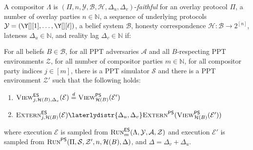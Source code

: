 \begin{definition}
  A compositor $\Lambda$
  is $(\Pi,\allowbreak n,\allowbreak \mathcal{Y},\allowbreak \mathcal{B},\allowbreak \mathcal{H},\allowbreak \Delta_u,\allowbreak \Delta_v)$-\emph{faithful}
  for an overlay protocol $\Pi$,
  a number of overlay parties $n \in \mathbb{N}$,
  a sequence of underlying protocols $\mathcal{Y} = (\Y[][1], \ldots, \Y[][\ell])$,
  a belief system $\mathcal{B}$,
  honesty correspondence $\mathcal{H}: \mathcal{B} \longrightarrow 2^{[n]}$,
  lateness $\Delta_u \in \mathbb{N}$,
  and reality lag $\Delta_v \in \mathbb{N}$
  if:

  For all beliefs $B \in \mathcal{B}$,
  for all PPT adversaries $\mathcal{A}$ and all
  $B$-respecting PPT environments $\mathcal{Z}$,
  for all number of compositor parties $m \in \mathbb{N}$,
  for all compositor party indices $j \in [m]$,
  there is a PPT simulator $\mathcal{S}$ and there is a
  PPT environment $\mathcal{Z}'$ such that
  the following holds:

  \begin{enumerate}
    \item $\LCView_{j,\mathcal{H}(B),\Delta_v}(\mathcal{E}) \distreq \PEView_{\mathcal{H}(B)}(\mathcal{E}')$
    \item $\LCExtern_{j,\mathcal{H}(B)}(\mathcal{E}) \laterlydistr{\Delta_u,\Delta_v} \PEExtern(\PEView_{\mathcal{H}(B)}(\mathcal{E}'))$
  \end{enumerate}

  where execution $\mathcal{E}$ is sampled from
  $\textsc{Run}^{\textsf{ES}}_m(\Lambda, \mathcal{Y}, \mathcal{A}, \mathcal{Z})$
  and execution $\mathcal{E}'$ is sampled from
  $\textsc{Run}^{\textsf{PS}}(\Pi, \mathcal{S}, \mathcal{Z}', n, \mathcal{H}(B), \Delta)$,
  and $\Delta = \Delta_v + \Delta_u$.
\end{definition}


